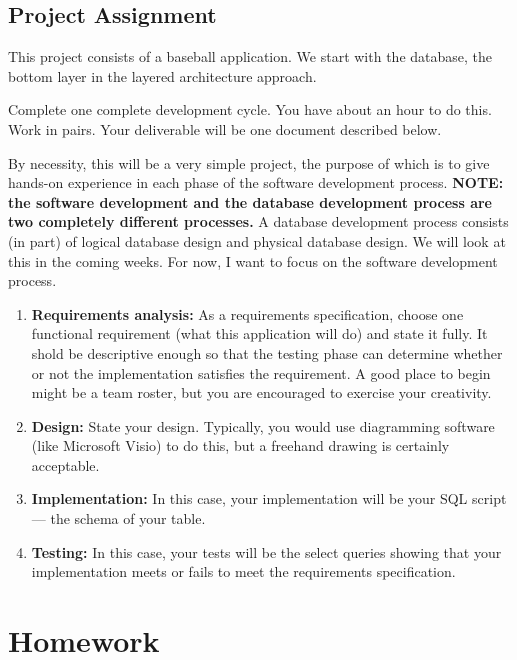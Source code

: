 \documentclass{article}
\begin{document}
        \subsection{Project Assignment}

        This project consists of a baseball application. We start with the database, the bottom layer in the layered architecture approach.

        Complete one complete development cycle. You have about an hour to do this. Work in pairs. Your deliverable will be one document described below.

        By necessity, this will be a very simple project, the purpose of which is to give hands-on experience in each phase of the software development process. \textbf{NOTE: the software development and the database development process are two completely different processes.} A database development process consists (in part) of logical database design and physical database design. We will look at this in the coming weeks. For now, I want to focus on the software development process. 

        \begin{enumerate}
            \item \textbf{Requirements analysis:} As a requirements specification, choose one functional requirement (what this application will do) and state it fully. It shold be descriptive enough so that the testing phase can determine whether or not the implementation satisfies the requirement. A good place to begin might be a team roster, but you are encouraged to exercise your creativity. 

            \item \textbf{Design:} State your design. Typically, you would use diagramming software (like Microsoft Visio) to do this, but a freehand drawing is certainly acceptable.  

            \item \textbf{Implementation:} In this case, your implementation will be your SQL script --- the schema of your table. 

            \item \textbf{Testing:} In this case, your tests will be the select queries showing that your implementation meets or fails to meet the requirements specification. 

        \end{enumerate}

    \section{Homework}
\end{document}
